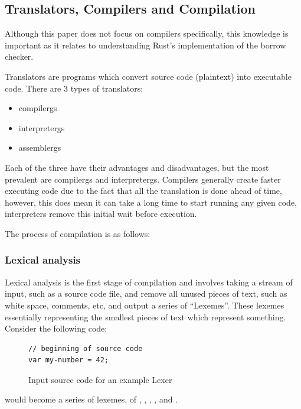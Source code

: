 \documentclass[a4paper]{article}
\begin{document}
\subsection{Translators, Compilers and Compilation}
Although this paper does not focus on compilers specifically, this knowledge is important as it relates to understanding Rust's implementation of the borrow checker.

Translators are programs which convert source code (plaintext) into executable code.
There are 3 types of translators:
\begin{itemize}
	\item \Glspl{compilerg}
	\item \Glspl{interpreterg}
	\item \Glspl{assemblerg}
\end{itemize}

Each of the three have their advantages and disadvantages, but the most prevalent are \glspl{compilerg} and \glspl{interpreterg}. Compilers generally create faster executing code due to the fact that all the translation is done ahead of time, however, this does mean it can take a long time to start running any given code, interpreters remove this initial wait before execution.

The process of compilation is as follows:
\subsubsection{Lexical analysis}
Lexical analysis is the first stage of compilation and involves taking a stream of input, such as a source code file, and remove all unused pieces of text, such as white space, comments, etc, and output a series of ``Lexemes''. These lexemes essentially representing the smallest pieces of text which represent something. Consider the following code:

\begin{figure}[H]
	\begin{lstlisting}
// beginning of source code
var my-number = 42;
 	\end{lstlisting}
	\caption{Input source code for an example Lexer}
	\label{fig:code:pre-lexer}
\end{figure}

would become a series of lexemes, of , , , , and  \parencite{crafting-interpreters}.
\end{document}
